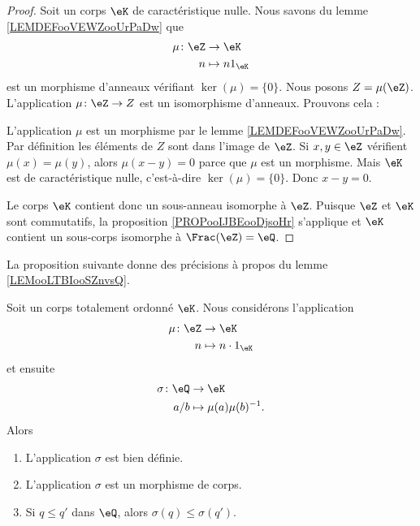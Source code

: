 \begin{proof}
	Soit un corps \( \eK\) de caractéristique nulle. Nous savons du lemme \ref{LEMDEFooVEWZooUrPaDw} que
	\begin{equation}
		\begin{aligned}
			\mu\colon \eZ & \to \eK          \\
			n             & \mapsto n1_{\eK}
		\end{aligned}
	\end{equation}
	est un morphisme d'anneaux vérifiant \( \ker(\mu)=\{ 0 \}\). Nous posons \( Z=\mu(\eZ)\). L'application \( \mu\colon \eZ\to Z\) est un isomorphisme d'anneaux. Prouvons cela :
	\begin{subproof}
		\spitem[Morphisme]
		L'application \( \mu\) est un morphisme par le lemme \ref{LEMDEFooVEWZooUrPaDw}.
		\spitem[Surjectif]
		Par définition les éléments de \( Z\) sont dans l'image de \( \eZ\).
		\spitem[Injectif] Si \( x,y\in \eZ\) vérifient \( \mu(x)=\mu(y)\), alors \( \mu(x-y)=0\) parce que \( \mu\) est un morphisme. Mais \( \eK\) est de caractéristique nulle, c'est-à-dire \( \ker(\mu)=\{ 0 \}\). Donc \( x-y=0\).
	\end{subproof}
	Le corps \( \eK\) contient donc un sous-anneau isomorphe à \( \eZ\). Puisque \( \eZ\) et \( \eK\) sont commutatifs, la proposition \ref{PROPooIJBEooDjsoHr} s'applique et \( \eK\) contient un sous-corps isomorphe à \( \Frac(\eZ)=\eQ\).
\end{proof}

La proposition suivante donne des précisions à propos du lemme \ref{LEMooLTBIooSZnvsQ}.

\begin{proposition}      \label{PROPooKNROooFdgIeQ}
	Soit un corps totalement ordonné \( \eK\). Nous considérons l'application
	\begin{equation}
		\begin{aligned}
			\mu\colon \eZ & \to \eK                \\
			n             & \mapsto n\cdot 1_{\eK}
		\end{aligned}
	\end{equation}
	et ensuite
	\begin{equation}
		\begin{aligned}
			\sigma\colon \eQ & \to \eK                    \\
			a/b              & \mapsto \mu(a)\mu(b)^{-1}.
		\end{aligned}
	\end{equation}
	Alors
	\begin{enumerate}
		\item
		      L'application \( \sigma\) est bien définie.
		\item
		      L'application \( \sigma\) est un morphisme de corps.
		\item
		      Si \( q\leq q'\) dans \( \eQ\), alors \( \sigma(q)\leq \sigma(q')\).
	\end{enumerate}
\end{proposition}

